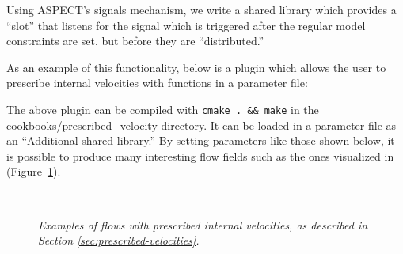 \documentclass{article}
\newcommand{\aspect}{\textsc{ASPECT}}
\begin{document}
Using \aspect{}'s signals mechanism, we write a shared library which provides a
``slot'' that listens for the signal which is triggered after the regular model
constraints are set, but before they are ``distributed.''

As an example of this functionality, below is a plugin which allows the user to prescribe
internal velocities with functions in a parameter file:


The above plugin can be compiled with \texttt{cmake . \&\& make} in the
\url{cookbooks/prescribed_velocity} directory. It can be loaded in a parameter file
as an ``Additional shared library.'' By setting parameters like those shown below,
it is possible to produce many interesting flow fields such as the ones visualized in
(Figure~\ref{fig:prescribed-velocity}).


\begin{figure}
    \centering
  ~
    \caption{\it Examples of flows with prescribed internal velocities, as described in Section \ref{sec:prescribed-velocities}.}
    \label{fig:prescribed-velocity}
\end{figure}
\end{document}
